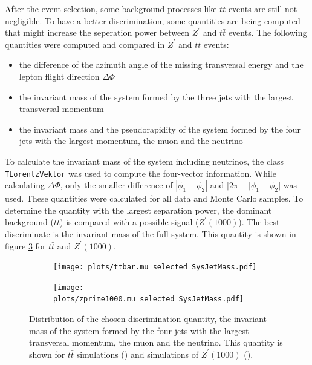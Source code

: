 After the event selection, some background processes like $t\bar{t}$ events are still not negligible.
To have a better discrimination, some quantities are being computed that might increase the seperation power between $Z^\prime$ and $t\bar{t}$ events. The following quantities were computed and compared in $Z^\prime$ and $t\bar{t}$ events:
\begin{itemize}
 \item the difference of the azimuth angle of the missing transversal energy and the lepton flight direction $\Delta\Phi$
 \item the invariant mass of the system formed by the three jets with the largest transversal momentum
 \item the invariant mass and the pseudorapidity of the system formed by the four jets with the largest momentum, the muon and the neutrino
\end{itemize}
To calculate the invariant mass of the system including neutrinos, the class \texttt{TLorentzVektor} was used to compute the four-vector information.
While calculating $\Delta\Phi$, only the smaller difference of $|\phi_1 - \phi_2|$ and $|2\pi - |\phi_1 - \phi_2|$ was used.
These quantities were calculated for all data and Monte Carlo samples.
To determine the quantity with the largest separation power, the dominant background ($t\bar{t}$) is compared with a possible signal ($Z^\prime(1000)$).
The best discriminate is the invariant mass of the full system.
This quantity is shown in figure \ref{fig:Comparison} for $t\bar{t}$ and $Z^\prime(1000)$.

\begin{figure}
  \begin{subfigure}{0.5\textwidth}
    \centering
    \texttt{[image: plots/ttbar.mu\_selected\_SysJetMass.pdf]}
    \caption{}
    \label{fig:ttbar_sys}
  \end{subfigure}%
  \begin{subfigure}{0.5\textwidth}
    \centering
    \texttt{[image: plots/zprime1000.mu\_selected\_SysJetMass.pdf]}
    \caption{}
    \label{fig:zprime_sys}
  \end{subfigure}%
  \caption{Distribution of the chosen discrimination quantity, the invariant mass of the system formed by the four jets with the largest transversal momentum, the muon and the neutrino.
This quantity is shown for $t\bar{t}$ simulations () and simulations of  $Z^\prime(1000)$ ().
  }
  \label{fig:Comparison}
\end{figure}
